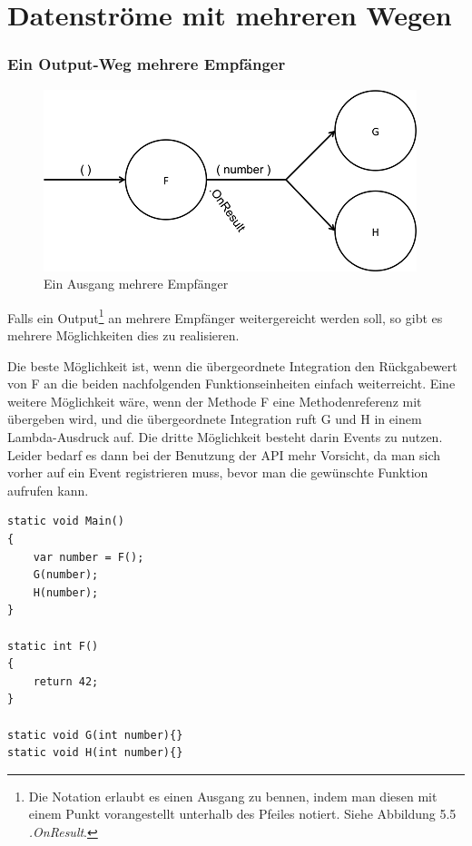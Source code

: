 \section{Datenströme mit mehreren Wegen}

\subsubsection{Ein Output-Weg mehrere Empfänger}

\begin{figure}[H]
	\centering
	\includegraphics[width=.7\linewidth]{./img/diagramOut1to2.png}
	\caption{Ein Ausgang mehrere Empfänger}
\end{figure}


Falls ein Output\footnote{Die Notation erlaubt es einen Ausgang zu bennen, indem man diesen mit einem Punkt vorangestellt unterhalb des Pfeiles notiert. Siehe Abbildung 5.5 \textit{.OnResult}.} an mehrere Empfänger weitergereicht werden soll, so gibt es
mehrere Möglichkeiten dies zu realisieren.


Die beste Möglichkeit ist, wenn die übergeordnete Integration den Rückgabewert
von F an die beiden nachfolgenden Funktionseinheiten einfach weiterreicht.
Eine weitere Möglichkeit wäre, wenn der Methode F eine Methodenreferenz mit übergeben wird,
und die übergeordnete Integration ruft G und H in einem Lambda-Ausdruck auf.
Die dritte Möglichkeit besteht darin Events zu nutzen.
Leider bedarf es dann bei der Benutzung der API mehr Vorsicht, da man sich vorher auf ein Event registrieren muss, bevor man
die gewünschte Funktion aufrufen kann.

\begin{lstlisting}[caption= Mehrere Empfänger eines Outputs]
static void Main()
{ 
    var number = F();
    G(number);
    H(number);
}

static int F()
{
	return 42;
}

static void G(int number){}
static void H(int number){}
\end{lstlisting}




